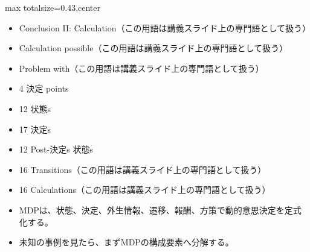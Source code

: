 \clearpage
{}
\begin{minipage}[t]{0.405\textwidth}
\begin{adjustbox}{max totalsize={\textwidth}{0.43\textheight},center}
\begin{minipage}{\textwidth}\scriptsize
{}\begin{itemize}
\item Conclusion II: Calculation（この用語は講義スライド上の専門語として扱う）
\item Calculation possible（この用語は講義スライド上の専門語として扱う）
\item Problem with（この用語は講義スライド上の専門語として扱う）
\item 4 決定 points
\item 12 状態s
\item 17 決定s
\item 12 Post-決定s 状態s
\item 16 Transitions（この用語は講義スライド上の専門語として扱う）
\item 16 Calculations（この用語は講義スライド上の専門語として扱う）
\end{itemize}\begin{itemize}
\item MDPは、状態、決定、外生情報、遷移、報酬、方策で動的意思決定を定式化する。
\item 未知の事例を見たら、まずMDPの構成要素へ分解する。
\end{itemize}
\end{minipage}
\end{adjustbox}
\end{minipage}\hfill

